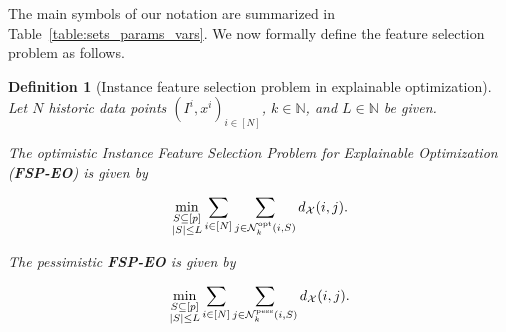 \documentclass[11pt, a4paper]{article}
\newtheorem{definition}{Definition}
\newcommand{\fspeo}{FSP-EO\xspace}
\newcommand{\instanceindex}{i}
\newcommand{\fsel}{S} %
\newcommand{\selectionset}{\fsel}
\newcommand{\neighbour}{\ensuremath{\mathcal{N}}}
\newcommand{\skOpt}[1][(\instanceindex,\selectionset)]{\neighbour_k^\textnormal{opt}#1}
\newcommand{\skPess}[1][(\instanceindex,\selectionset)]{\neighbour_k^\textnormal{pess}#1}
\begin{document}
The main symbols of our notation are summarized in Table~\ref{table:sets_params_vars}. 
We now formally define the feature selection problem as follows. 

\begin{definition}[Instance feature selection problem in explainable optimization]
	\label{def:FSP-EO}
Let $N$ historic data points $(I^i, x^i)_{i \in [N]}$, $k\in\mathbb{N}$, and $L\in\mathbb{N}$ be given.

The \emph{optimistic Instance Feature Selection Problem for Explainable Optimization} (\textbf{\fspeo}) is given by

\[
\min_{\substack{\selectionset\subseteq [p]\\ |\selectionset|\leq L}} \sum_{i\in[N]}
      \sum_{j\in \skOpt } d_{\mathcal{X}}(i,j).
\]

The \emph{pessimistic} \textbf{\fspeo} is given by

\[
\min_{\substack{\selectionset\subseteq [p]\\ |\selectionset|\leq L}} \sum_{i\in[N]}
      \sum_{j\in \skPess} d_{\mathcal{X}}(i,j).
\]
\end{definition}
\end{document}
